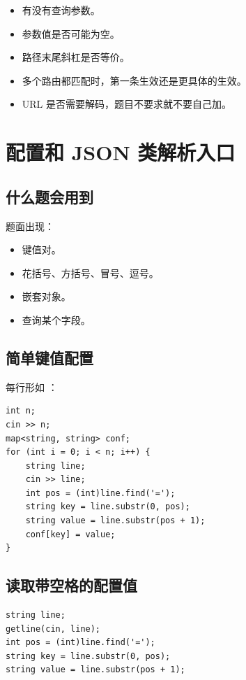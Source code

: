 \begin{itemize}
  \item 有没有查询参数。
  \item 参数值是否可能为空。
  \item 路径末尾斜杠是否等价。
  \item 多个路由都匹配时，第一条生效还是更具体的生效。
  \item URL 是否需要解码，题目不要求就不要自己加。
\end{itemize}

\section{配置和 JSON 类解析入口}\label{sec:07-20}

\subsection{什么题会用到}

题面出现：

\begin{itemize}
  \item 键值对。
  \item 花括号、方括号、冒号、逗号。
  \item 嵌套对象。
  \item 查询某个字段。
\end{itemize}

\subsection{简单键值配置}

每行形如 ：

\begin{lstlisting}
int n;
cin >> n;
map<string, string> conf;
for (int i = 0; i < n; i++) {
    string line;
    cin >> line;
    int pos = (int)line.find('=');
    string key = line.substr(0, pos);
    string value = line.substr(pos + 1);
    conf[key] = value;
}
\end{lstlisting}

\subsection{读取带空格的配置值}

\begin{lstlisting}
string line;
getline(cin, line);
int pos = (int)line.find('=');
string key = line.substr(0, pos);
string value = line.substr(pos + 1);
\end{lstlisting}

